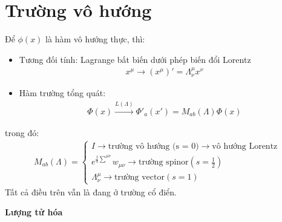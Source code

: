 \documentclass{report}
\begin{document}
\section*{Trường vô hướng}
Để $\phi(x)$ là hàm vô hướng thực, thì:
\begin{itemize}
	\item Tương đối tính: Lagrange bất biến dưới phép biến đổi Lorentz
	      \begin{align*}
		      x^\mu \rightarrow (x^\mu)' =\Lambda_\nu^\mu x^{\nu}
	      \end{align*}
	\item Hàm trường tổng quát:
	      \begin{align*}
		      \Phi(x) \xrightarrow{L(\Lambda)}\Phi'_a(x') = M_{ab}(\Lambda)\Phi(x)
	      \end{align*}
\end{itemize}
trong đó:
\begin{align*}
	M_{ab}(\Lambda) =
	\begin{cases*}
		I \rightarrow \text{trường vô hướng (s = 0)}\rightarrow \text{vô hướng Lorentz}          \\
		e^{\frac{1}{4}\sum_{}^{\mu\nu}}w_{\mu\nu}\rightarrow \text{trường spinor}(s=\frac{1}{2}) \\
		\Lambda_\nu^\mu \rightarrow \text{trường vector}(s=1)
	\end{cases*}
\end{align*}
Tất cả điều trên vẫn là đang ở trường cổ điển.

\textbf{Lượng tử hóa}
\end{document}
